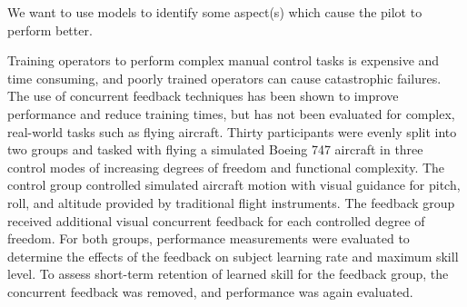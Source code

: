 
We want to use models to identify some aspect(s) which cause the pilot to perform better.

Training operators to perform complex manual control tasks is expensive and time consuming, and poorly trained operators can cause catastrophic failures.
The use of concurrent feedback techniques has been shown to improve performance and reduce training times, but has not been evaluated for complex, real-world tasks such as flying aircraft.
Thirty participants were evenly split into two groups and tasked with flying a simulated Boeing 747 aircraft in three control modes of increasing degrees of freedom and functional complexity.
The control group controlled simulated aircraft motion with visual guidance for pitch, roll, and altitude provided by traditional flight instruments.
The feedback group received additional visual concurrent feedback for each controlled degree of freedom.
For both groups, performance measurements were evaluated to determine the effects of the feedback on subject learning rate and maximum skill level.
To assess short-term retention of learned skill for the feedback group, the concurrent feedback was removed, and performance was again evaluated.

